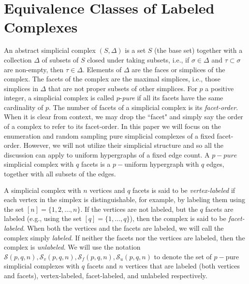 \documentclass[12pt]{article}
\theoremstyle{plain}
\theoremstyle{definition}
\theoremstyle{remark}
\begin{document}
\section{Equivalence Classes of Labeled Complexes}
\label{sec:facet-labeled}
An abstract simplicial complex $(S,\Delta)$ is a set $S$ (the base set) together with a collection $\Delta$ of subsets of $S$ closed under taking subsets, i.e., if $\sigma\in \Delta$ and $\tau\subset\sigma$ are non-empty, then $\tau\in\Delta$. Elements of $\Delta$ are the faces or simplices of the complex. The facets of the complex are the maximal simplices, i.e., those simplices in $\Delta$ that are not proper subsets of other simplices. For $p$ a positive integer, a simplicial complex is called $p$-{\em pure} if all its facets have the same cardinality of $p$. The number of facets of a simplicial complex is its {\em facet-order}. When it is clear from context, we may drop the ``facet" and simply say the order of a complex to refer to its facet-order. In this paper we will focus on the enumeration and random sampling pure simplicial complexes of a fixed facet-order. However, we will not utilize their simplicial structure and so all the discussion can apply to uniform hypergraphs of a fixed edge count. A $p-pure$ simplicial complex with $q$ facets is a $p-$uniform hypergraph with $q$ edges, together with all subsets of the edges.



A simplicial complex with $n$ vertices and $q$ facets is said to be {\em vertex-labeled} if each vertex in the simplex is distinguishable, for example, by labeling them using the set $[n]=\{1,2,\ldots,n\}$. If the vertices are not labeled, but the $q$ facets are labeled (e.g., using the set $[q]=\{1,\dots,q\}$), then the complex is said to be {\em facet-labeled}. When both the vertices and the facets are labeled, we will call the complex simply {\em labeled}. If neither the facets nor the vertices are labeled, then the complex is {\em unlabeled}. We will use the notation $\mathcal{S}(p,q,n), \mathcal{S}_v(p,q,n), \mathcal{S}_f(p,q,n), \mathcal{S}_u(p,q,n)$ to denote the set of $p-$pure simplicial complexes with $q$ facets and $n$ vertices that are labeled (both vertices and facets), vertex-labeled, facet-labeled, and unlabeled respectively.
\end{document}
